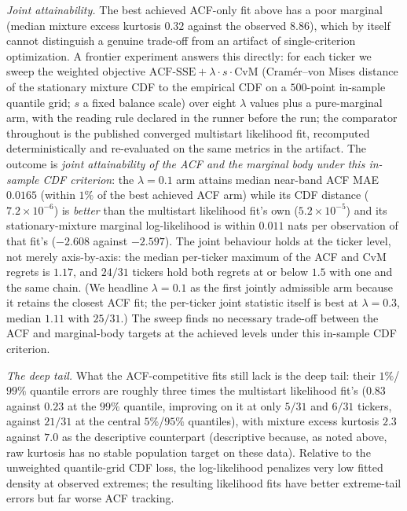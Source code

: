 \emph{Joint attainability.} The best achieved ACF-only fit above has a poor marginal (median mixture excess kurtosis $0.32$ against the observed $8.86$), which by itself cannot distinguish a genuine trade-off from an artifact of single-criterion optimization. A frontier experiment answers this directly: for each ticker we sweep the weighted objective $\mathrm{ACF\text{-}SSE} + \lambda \cdot s \cdot \mathrm{CvM}$ (Cram\'er--von Mises distance of the stationary mixture CDF to the empirical CDF on a $500$-point in-sample quantile grid; $s$ a fixed balance scale) over eight $\lambda$ values plus a pure-marginal arm, with the reading rule declared in the runner before the run; the comparator throughout is the published converged multistart likelihood fit, recomputed deterministically and re-evaluated on the same metrics in the artifact. The outcome is \emph{joint attainability of the ACF and the marginal body under this in-sample CDF criterion}: the $\lambda = 0.1$ arm attains median near-band ACF MAE $0.0165$ (within $1\%$ of the best achieved ACF arm) while its CDF distance ($7.2 \times 10^{-6}$) is \emph{better} than the multistart likelihood fit's own ($5.2 \times 10^{-5}$) and its stationary-mixture marginal log-likelihood is within $0.011$ nats per observation of that fit's ($-2.608$ against $-2.597$). The joint behaviour holds at the ticker level, not merely axis-by-axis: the median per-ticker maximum of the ACF and CvM regrets is $1.17$, and $24/31$ tickers hold both regrets at or below $1.5$ with one and the same chain. (We headline $\lambda = 0.1$ as the first jointly admissible arm because it retains the closest ACF fit; the per-ticker joint statistic itself is best at $\lambda = 0.3$, median $1.11$ with $25/31$.) The sweep finds no necessary trade-off between the ACF and marginal-body targets at the achieved levels under this in-sample CDF criterion.

\emph{The deep tail.} What the ACF-competitive fits still lack is the deep tail: their $1\%$/$99\%$ quantile errors are roughly three times the multistart likelihood fit's ($0.83$ against $0.23$ at the $99\%$ quantile, improving on it at only $5/31$ and $6/31$ tickers, against $21/31$ at the central $5\%$/$95\%$ quantiles), with mixture excess kurtosis $2.3$ against $7.0$ as the descriptive counterpart (descriptive because, as noted above, raw kurtosis has no stable population target on these data). Relative to the unweighted quantile-grid CDF loss, the log-likelihood penalizes very low fitted density at observed extremes; the resulting likelihood fits have better extreme-tail errors but far worse ACF tracking.

